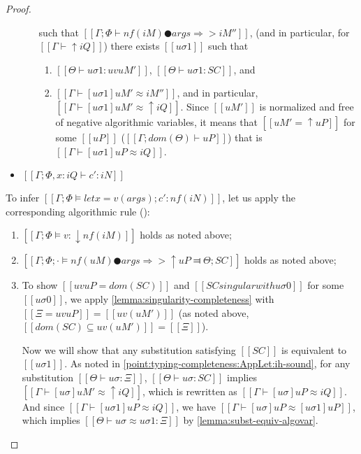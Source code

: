 \begin{proof}
\begin{caseof}
\begin{itemize}
\begin{enumerate}
                            such that $[[Γ; Φ ⊢ nf(iM) ● args ⇒> iM'']]$,
                            (and in particular, for $[[Γ ⊢ ↑iQ]]$)
                            there exists $[[uσ1]]$ such that 
                            \begin{enumerate}
                                \item 
                                    $[[ Θ  ⊢ uσ1 : uv uM' ]]$,
                                    $[[ Θ  ⊢ uσ1 : SC ]]$, and 
                                \item $[[Γ ⊢ [uσ1]uM' ≈ iM'']]$, and 
                                    in particular, $[[Γ ⊢ [uσ1]uM' ≈ ↑iQ]]$.
                                    Since $[[uM']]$ is
                                    normalized and free of 
                                    negative algorithmic variables, it means that 
                                    $[[uM' = ↑uP]]$ for some $[[uP]]$ 
                                    ($[[Γ; dom(Θ) ⊢  uP]]$)
                                    that is $[[Γ ⊢ [uσ1]uP ≈ iQ]]$.
                            \end{enumerate}
                    \end{enumerate}
                \item $[[Γ; Φ, x:iQ ⊢ c' : iN]]$
            \end{itemize}

            To infer $[[Γ ; Φ ⊨ let x = v(args); c' : nf(iN)]]$, 
            let us apply the corresponding algorithmic rule 
            ():
            \begin{enumerate}
                \item $[[Γ ; Φ ⊨ v : ↓nf(iM)]]$ holds as noted above;

                \item $[[Γ; Φ ; · ⊨ nf(uM) ● args ⇒> ↑uP ⫤ Θ; SC]]$ holds as noted above;

                \item To show $[[uv uP = dom(SC)]]$ and 
                    $[[SC singular with uσ0]]$ for some $[[uσ0]]$,
                    we apply \cref{lemma:singularity-completeness}
                    with $[[Ξ = uv uP]] = [[uv(uM')]]$ (as noted above, $[[dom(SC) ⊆ uv(uM')]] = [[Ξ]]$).

                    Now we will show that any substitution satisfying $[[SC]]$ is equivalent to $[[uσ1]]$.
                    As noted in \ref{point:typing-completeness:AppLet:ih-sound},
                    for any substitution $[[Θ ⊢ uσ : Ξ]]$, $[[ Θ ⊢ uσ : SC ]]$ implies 
                    $[[Γ ⊢ [uσ]uM' ≈ ↑iQ]]$,
                    which is rewritten as $[[Γ ⊢ [uσ]uP ≈ iQ]]$.
                    And since $[[Γ ⊢ [uσ1]uP ≈ iQ]]$, 
                    we have $[[Γ ⊢ [uσ]uP ≈ [uσ1]uP]]$,
                    which implies $[[Θ ⊢ uσ ≈ uσ1 : Ξ]]$ by \cref{lemma:subst-equiv-algovar}.


\end{enumerate}
\end{caseof}
\end{proof}

